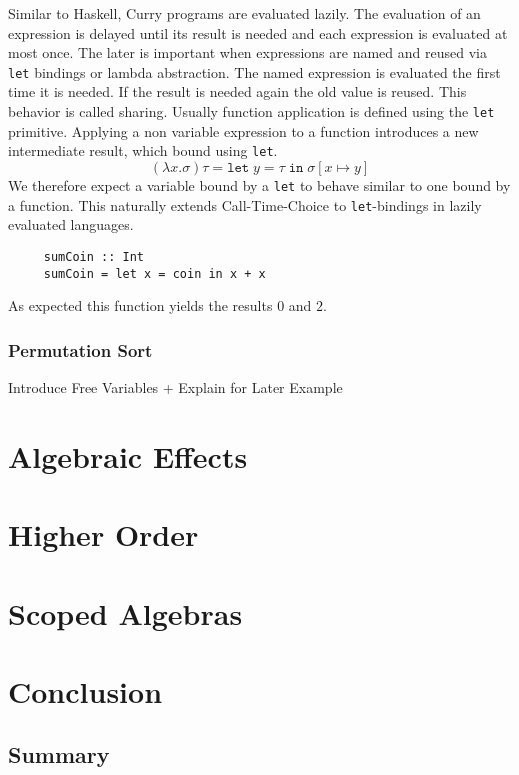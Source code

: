 \documentclass[10pt,a4paper,twoside]{report}
\begin{document}
Similar to Haskell, Curry programs are evaluated lazily.
The evaluation of an expression is delayed until its result is needed and each
expression is evaluated at most once.
The later is important when expressions are named and reused via \texttt{let}
bindings or lambda abstraction.
The named expression is evaluated the first time it is needed.
If the result is needed again the old value is reused.
This behavior is called sharing.
Usually function application is defined using the \texttt{let} primitive.
Applying a non variable expression to a function introduces a new intermediate
result, which bound using \texttt{let}.
$$
(\lambda x.\sigma) \tau = \texttt{let}\;y = \tau\;\texttt{in}\;\sigma[x\mapsto y]
$$
We therefore expect a variable bound by a \texttt{let} to behave similar to one
bound by a function.
This naturally extends Call-Time-Choice to \texttt{let}-bindings in lazily
evaluated languages.

\begin{verbatim}
     sumCoin :: Int
     sumCoin = let x = coin in x + x
\end{verbatim}
As expected this function yields the results $0$ and $2$.

\subsection{Permutation Sort}

Introduce Free Variables + Explain for Later Example


\chapter{Algebraic Effects}
\label{chapter:first-order}



\chapter{Higher Order}
\label{chapter:higher-order}



\chapter{Scoped Algebras}
\label{chapter:scoped-algebras}



\chapter{Conclusion}
\section{Summary}

\printbibliography
\end{document}
